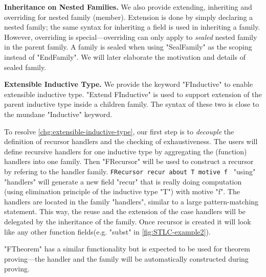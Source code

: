 
\textbf{Inheritance on Nested Families.} We also provide extending, inheriting and overriding for nested family (member). Extension is done by simply declaring a nested family; the same syntax for inheriting a field is used in inheriting a family. However, overriding is special---overriding can only apply to \textit{sealed} nested family in the parent family. A family is sealed when using "SealFamily" as the scoping instead of "EndFamily". We will later elaborate the motivation and details of sealed family. 


\textbf{Extensible Inductive Type.} We provide the keyword "FInductive" to enable extensible inductive type. "Extend FInductive" is used to support extension of the parent inductive type inside a children family. The syntax of these two is close to the mundane "Inductive" keyword. 


To resolve \ref{chg:extensible-inductive-type}, our first step is to \textit{decouple} the definition of recursor handlers and the checking of exhaustiveness. The users will define recursive handlers for one inductive type by aggregating the (function) handlers into one family. Then
"FRecursor" will be used to construct a recursor by refering to the handler family.
\texttt{FRecursor recur about T motive f } "using"
"handlers" will generate a new field "recur" that is really doing computation
(using elimination principle of the inductive type "T") with motive "f". The handlers
are located in the family "handlers", similar to a large pattern-matching statement. This way, the reuse and the extension of the case handlers will be delegated by the inheritance of the family. Once recursor is created it will look like any other function fields(e.g. "subst" in \cref{fig:STLC-example2}).

"FTheorem" has a similar functionality but is expected to be used for theorem proving---the handler and the family will be automatically constructed during proving.


